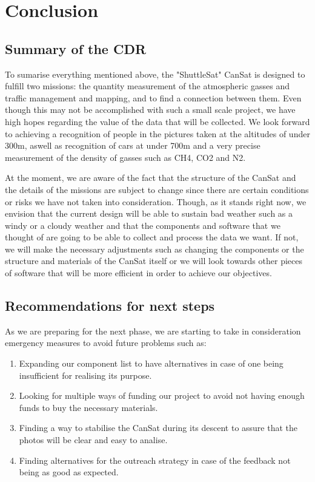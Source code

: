 \documentclass[11pt]{article}
\begin{document}
\section{Conclusion}

\subsection{Summary of the CDR}
\hspace{0.5cm} To sumarise everything mentioned above, the "ShuttleSat" CanSat is designed to fulfill two missions: the quantity measurement of the atmospheric gasses and traffic management and mapping, and to find a connection between them. Even though this may not be accomplished with such a small scale project, we have high hopes regarding the value of the data that will be collected. We look forward to achieving a recognition of people in the pictures taken at the altitudes of under 300m, aswell as recognition of cars at under 700m and a very precise measurement of the density of gasses such as CH4, CO2 and N2.
\newline

At the moment, we are aware of the fact that the structure of the CanSat and the details of the missions are subject to change since there are certain conditions or risks we have not taken into consideration. Though, as it stands right now, we envision that the current design will be able to sustain bad weather such as a windy or a cloudy weather and that the components and software that we thought of are going to be able to collect and process the data we want. If not, we will make the necessary adjustments such as changing the components or the structure and materials of the CanSat itself or we will look towards other pieces of software that will be more efficient in order to achieve our objectives.



\subsection{Recommendations for next steps}
\hspace{0.5cm} As we are preparing for the next phase, we are starting to take in consideration emergency measures to avoid future problems such as:
\begin{enumerate}
\item Expanding our component list to have alternatives in case of one being insufficient for realising its purpose.
\item Looking for multiple ways of funding our project to avoid not having enough funds to buy the necessary materials.
\item Finding a way to stabilise the CanSat during its descent to assure that the photos will be clear and easy to analise.
\item Finding alternatives for the outreach strategy in case of the feedback not being as good as expected.
\end{enumerate}
\end{document}
